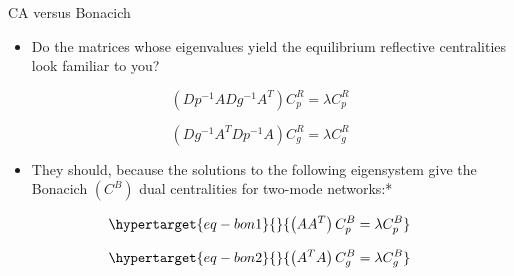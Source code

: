 \documentclass[
  ignorenonframetext,
]{beamer}
\providecommand{\tightlist}{%
  \setlength{\itemsep}{0pt}\setlength{\parskip}{0pt}}\usepackage{longtable,booktabs,array}
\begin{document}
\begin{frame}{CA versus Bonacich}
\protect\hypertarget{ca-versus-bonacich}{}
\begin{itemize}
\tightlist
\item
  Do the matrices whose eigenvalues yield the equilibrium reflective
  centralities look familiar to you?
\end{itemize}

\[
\left(Dp^{-1}ADg^{-1}A^T\right)C^R_p = \lambda C^R_p
\]

\[
\left(Dg^{-1}A^TDp^{-1}A\right)C^R_g = \lambda C^R_g
\]

\begin{itemize}
\tightlist
\item
  They should, because the solutions to the following eigensystem give
  the Bonacich \((C^B)\) dual centralities for two-mode networks:*
\end{itemize}

\begin{equation}\protect\hypertarget{eq-bon1}{}{
\left(AA^T\right)C^B_p = \lambda C^B_p
}\label{eq-bon1}\end{equation}

\begin{equation}\protect\hypertarget{eq-bon2}{}{
\left(A^TA\right)C^B_g = \lambda C^B_g
}\label{eq-bon2}\end{equation}

\end{frame}
\end{document}

